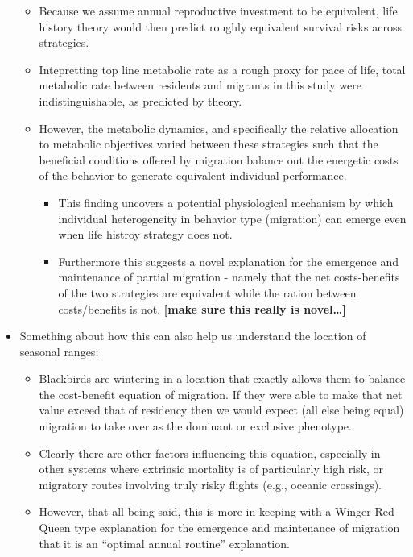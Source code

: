 \documentclass[
]{article}
\providecommand{\tightlist}{%
  \setlength{\itemsep}{0pt}\setlength{\parskip}{0pt}}
\begin{document}
\begin{itemize}
  \begin{itemize}
  \tightlist
  \item
    Because we assume annual reproductive investment to be equivalent,
    life history theory would then predict roughly equivalent survival
    risks across strategies.
  \item
    Intepretting top line metabolic rate as a rough proxy for pace of
    life, total metabolic rate between residents and migrants in this
    study were indistinguishable, as predicted by theory.
  \item
    However, the metabolic dynamics, and specifically the relative
    allocation to metabolic objectives varied between these strategies
    such that the beneficial conditions offered by migration balance out
    the energetic costs of the behavior to generate equivalent
    individual performance.

    \begin{itemize}
    \tightlist
    \item
      This finding uncovers a potential physiological mechanism by which
      individual heterogeneity in behavior type (migration) can emerge
      even when life histroy strategy does not.
    \item
      Furthermore this suggests a novel explanation for the emergence
      and maintenance of partial migration - namely that the net
      costs-benefits of the two strategies are equivalent while the
      ration between costs/benefits is not. \textbf{{[}make sure this
      really is novel\ldots{]}}
    \end{itemize}
  \end{itemize}
\item
  Something about how this can also help us understand the location of
  seasonal ranges:

  \begin{itemize}
  \tightlist
  \item
    Blackbirds are wintering in a location that exactly allows them to
    balance the cost-benefit equation of migration. If they were able to
    make that net value exceed that of residency then we would expect
    (all else being equal) migration to take over as the dominant or
    exclusive phenotype.
  \item
    Clearly there are other factors influencing this equation,
    especially in other systems where extrinsic mortality is of
    particularly high risk, or migratory routes involving truly risky
    flights (e.g., oceanic crossings).
  \item
    However, that all being said, this is more in keeping with a Winger
    Red Queen type explanation for the emergence and maintenance of
    migration that it is an ``optimal annual routine'' explanation.
  \end{itemize}
\end{itemize}
\end{document}
